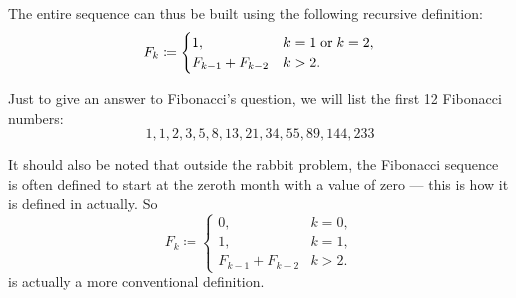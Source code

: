 \begin{example}
  The entire sequence can thus be built using the following recursive definition:
  \begin{equation*}
    F_k \coloneqq \begin{cases}
      1,                &k = 1 \T{or} k = 2, \\
      F_{k-1} + F_{k-2} &k > 2.
    \end{cases}
  \end{equation*}

  Just to give an answer to Fibonacci's question, we will list the first 12 Fibonacci numbers:
  \begin{equation*}
    1, 1, 2, 3, 5, 8, 13, 21, 34, 55, 89, 144, 233
  \end{equation*}

  It should also be noted that outside the rabbit problem, the Fibonacci sequence is often defined to start at the zeroth month with a value of zero --- this is how it is defined in  actually. So
  \begin{equation}\label{eq:ex:fibonacci_rabbits}
    F_k \coloneqq \begin{cases}
      0,                &k = 0, \\
      1,                &k = 1, \\
      F_{k-1} + F_{k-2} &k > 2.
    \end{cases}
  \end{equation}
  is actually a more conventional definition.
\end{example}
